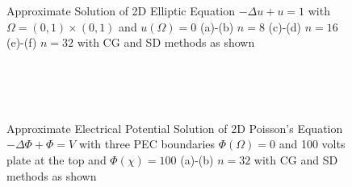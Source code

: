 \documentclass[11pt]{article}
\begin{document}
\begin{figure}
     \centering
    		 \subfloat[][]{ \label{8_n_CG}}
    		 \subfloat[][]{ \label{8_n_SD}}
\\
    		 \subfloat[][]{ \label{16_n_CG}}
    		 \subfloat[][]{ \label{16_n_SD}}
\\
    		 \subfloat[][]{ \label{32_n_CG}}
    		 \subfloat[][]{ \label{32_n_SD}}
     \centering
     \caption{Approximate Solution of 2D Elliptic Equation $-\Delta u +u = 1$  with $\Omega = (0 ,1)\times(0 ,1)$ and $u(\Omega) = 0$ (a)-(b) $n = 8$ (c)-(d) $n = 16$ (e)-(f) $n = 32$ with CG and SD methods as shown}
     \label{Tradiagonal}
\end{figure}
%
%
\newpage

\begin{figure}
     \centering
    		 \subfloat[][]{ \label{3_8_n_CG}}
    		 \subfloat[][]{ \label{3_8_n_SD}}
\\
    		 \subfloat[][]{ \label{3_16_n_CG}}
    		 \subfloat[][]{ \label{3_16_n_SD}}
\\
    		 \subfloat[][]{ \label{3_32_n_CG}}
    		 \subfloat[][]{ \label{3_32_n_SD}}
\\    		 
     \centering
     \caption{Approximate Electrical Potential Solution of 2D Poisson's Equation $-\Delta \Phi +\Phi = V$  with three PEC boundaries $\Phi(\Omega) = 0$ and 100 volts plate at the top and $\Phi(\chi) = 100$ (a)-(b) $n = 32$ with CG and SD methods as shown}
     \label{Trough}
\end{figure}
\end{document}
